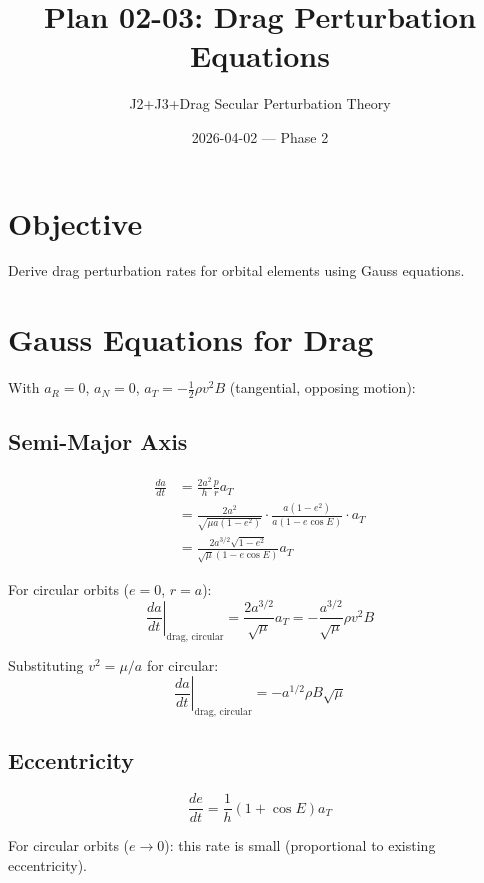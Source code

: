 \documentclass[11pt]{article}
\title{Plan 02-03: Drag Perturbation Equations}
\author{J2+J3+Drag Secular Perturbation Theory}
\date{2026-04-02 — Phase 2}
\begin{document}
\maketitle

\section{Objective}
Derive drag perturbation rates for orbital elements using Gauss equations.

\section{Gauss Equations for Drag}

With $a_R = 0$, $a_N = 0$, $a_T = -\frac{1}{2}\rho v^2 B$ (tangential, opposing motion):

\subsection{Semi-Major Axis}
\begin{align}
\frac{da}{dt} &= \frac{2a^2}{h}\frac{p}{r} a_T\\
&= \frac{2a^2}{\sqrt{\mu a(1-e^2)}} \cdot \frac{a(1-e^2)}{a(1-e\cos E)} \cdot a_T\\
&= \frac{2a^{3/2}\sqrt{1-e^2}}{\sqrt{\mu}(1-e\cos E)} a_T
\end{align}

For circular orbits ($e = 0$, $r = a$):
\begin{equation}
\boxed{\left.\frac{da}{dt}\right|_{\text{drag, circular}} = \frac{2a^{3/2}}{\sqrt{\mu}} a_T = -\frac{a^{3/2}}{\sqrt{\mu}}\rho v^2 B}
\end{equation}

Substituting $v^2 = \mu/a$ for circular:
\begin{equation}
\boxed{\left.\frac{da}{dt}\right|_{\text{drag, circular}} = -a^{1/2}\rho B\sqrt{\mu}}
\label{eq:dadt_drag}
\end{equation}

\subsection{Eccentricity}
\begin{equation}
\frac{de}{dt} = \frac{1}{h}(1 + \cos E) a_T
\end{equation}

For circular orbits ($e \to 0$): this rate is small (proportional to existing eccentricity).
\end{document}
